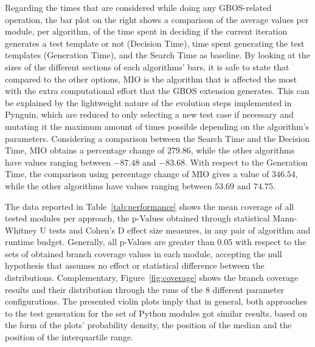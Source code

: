 \documentclass[%
  chapterprefix=false,%
  open=right,%
  twoside=true,%
  paper=a4,%
  logofile={Figures/logo.png},%
  thesistype=master,%
  UKenglish,%
]{se2thesis}
\begin{document}
Regarding the times that are considered while doing any GBOS-related operation, the bar plot on the right shows a comparison of the average values per module, per algorithm, of the time spent in deciding if the current iteration generates a test template or not (Decision Time), time spent generating the test templates (Generation Time), and the Search Time as baseline.
By looking at the sizes of the different sections of each algorithms' bars, it is safe to state that compared to the other options, MIO is the algorithm that is affected the most with the extra computational effort that the GBOS extension generates.
This can be explained by the lightweight nature of the evolution steps implemented in Pynguin, which are reduced to only selecting a new test case if necessary and mutating it the maximum amount of times possible depending on the algorithm's parameters.
Considering a comparison between the Search Time and the Decision Time, MIO obtains a percentage change of \(279.86\), while the other algorithms have values ranging between \(-87.48\) and \(-83.68\).
With respect to the Generation Time, the comparison using percentage change of MIO gives a value of \(346.54\), while the other algorithms have values ranging between \(53.69\) and \(74.75\).

The data reported in Table~\ref{tab:performance} shows the mean coverage of all tested modules per approach, the p-Values obtained through statistical Mann-Whitney U tests and Cohen's D effect size measures, in any pair of algorithm and runtime budget.
Generally, all p-Values are greater than \(0.05\) with respect to the sets of obtained branch coverage values in each module, accepting the null hypothesis that assumes no effect or statistical difference between the distributions.
Complementary, Figure~\ref{fig:coverage} shows the branch coverage results and their distribution through the runs of the 8 different parameter configurations.
The presented violin plots imply that in general, both approaches to the test generation for the set of Python modules got similar results, based on the form of the plots' probability density, the position of the median and the position of the interquartile range.
\end{document}

